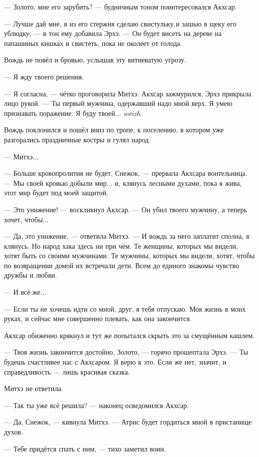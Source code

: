 --- Золото, мне его зарубить? --- будничным тоном поинтересовался Акхсар.

--- Лучше дай мне, я из его стержня сделаю свистульку и зашью в щеку его ублюдку, --- в тон ему добавила Эрхэ.
--- Он будет висеть на дереве на папашиных кишках и свистеть, пока не околеет от голода.

Вождь не повёл и бровью, услышав эту витиеватую угрозу.

--- Я жду твоего решения.

--- Я согласна, --- чётко проговорила Митхэ.
Акхсар зажмурился, Эрхэ прикрыла лицо рукой.
--- Ты первый мужчина, одержавший надо мной верх.
Я умею признавать поражение.
Я буду твоей... \textit{w\o{}izh}.

Вождь поклонился и пошёл вниз по тропе, к поселению, в котором уже разгорались праздничные костры и гулял народ.

--- Митхэ...

--- Больше кровопролития не будет, Снежок, --- прервала Акхсара воительница.
--- Мы своей кровью добыли мир... и, клянусь лесными духами, пока я жива, этот мир будет под моей защитой.

--- Это унижение! --- воскликнул Акхсар.
--- Он убил твоего мужчину, а теперь хочет, чтобы...

--- Да, это унижение, --- ответила Митхэ.
--- И вождь за него заплатит сполна, я клянусь.
Но народ хака здесь ни при чём.
Те женщины, которых мы видели, хотят быть со своими мужчинами.
Те мужчины, которых мы видели, хотят, чтобы по возвращении домой их встречали дети.
Всем до единого знакомы чувство дружбы и любви.

--- И всё же...

--- Если ты не хочешь идти со мной, друг, я тебя отпускаю.
Моя жизнь в моих руках, и сейчас мне совершенно плевать, как она закончится.

Акхсар обиженно крякнул и тут же попытался скрыть это за смущённым кашлем.

--- Твоя жизнь закончится достойно, Золото, --- горячо прошептала Эрхэ.
--- Ты будешь счастливее нас с Акхсаром.
Я верю в это.
Если же нет, значит, и справедливость --- лишь красивая сказка.

Митхэ не ответила.

--- Так ты уже всё решила? --- наконец осведомился Акхсар.

--- Да, Снежок, --- кивнула Митхэ.
--- Атрис будет гордиться мной в пристанище духов.

--- Тебе придётся спать с ним, --- тихо заметил воин.

